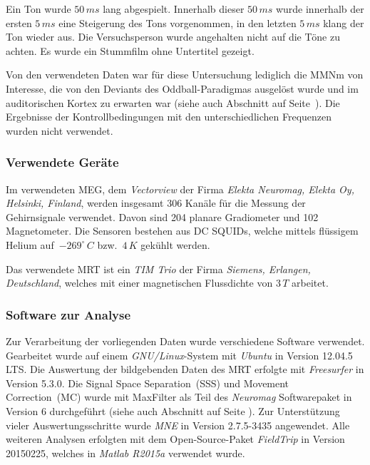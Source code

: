 \documentclass[doc,a4paper,12pt]{apa6}
\makeatletter
\DeclareRobustCommand*{\nameref}[1]{%
      \glqq{\myorg@nameref{#1}}\grqq%
    }%
\makeatother
\begin{document}
Ein Ton wurde $50\,ms$ lang abgespielt. Innerhalb dieser $50\,ms$ wurde innerhalb der ersten $5\,ms$ eine Steigerung des Tons vorgenommen, in den letzten $5\,ms$ klang der Ton wieder aus. Die Versuchsperson wurde angehalten nicht auf die Töne zu achten. Es wurde ein Stummfilm ohne Untertitel gezeigt.

Von den verwendeten Daten war für diese Untersuchung lediglich die MMNm von Interesse, die von den Deviants des Oddball-Paradigmas ausgelöst wurde und im auditorischen Kortex zu erwarten war (siehe auch Abschnitt \nameref{sec:audicort} auf Seite~\pageref{sec:audicort}). Die Ergebnisse der Kontrollbedingungen mit den unterschiedlichen Frequenzen wurden nicht verwendet.

\subsubsection{Verwendete Geräte}

Im verwendeten MEG, dem \emph{Vectorview} der Firma \emph{Elekta Neuromag, Elekta Oy, Helsinki, Finland}, werden insgesamt 306 Kanäle für die Messung der Gehirnsignale verwendet. Davon sind 204 planare Gradiometer und 102 Magnetometer. Die Sensoren bestehen aus DC SQUIDs, welche mittels flüssigem Helium auf~$-269^\circ\,C$ bzw.~$4\,K$ gekühlt werden.

Das verwendete MRT ist ein \emph{TIM Trio} der Firma \emph{Siemens, Erlangen, Deutschland}, welches mit einer magnetischen Flussdichte von $3\,T$ arbeitet.

\subsubsection{Software zur Analyse}
\label{sec:software}

Zur Verarbeitung der vorliegenden Daten wurde verschiedene Software verwendet. Gearbeitet wurde auf einem \emph{GNU/Linux}-System mit \emph{Ubuntu} in Version 12.04.5 LTS. Die Auswertung der bildgebenden Daten des MRT erfolgte mit \emph{Freesurfer} in Version 5.3.0. Die Signal Space Separation~(SSS) und Movement Correction~(MC) wurde mit MaxFilter als Teil des \emph{Neuromag} Softwarepaket in Version 6 durchgeführt (siehe auch Abschnitt \nameref{sec:maxfilter} auf Seite \pageref{sec:maxfilter}). Zur Unterstützung vieler Auswertungsschritte wurde \emph{MNE} in Version 2.7.5-3435 angewendet. Alle weiteren Analysen erfolgten mit dem Open-Source-Paket \emph{FieldTrip} in Version 20150225, welches in \emph{Matlab R2015a} verwendet wurde.
\end{document}
